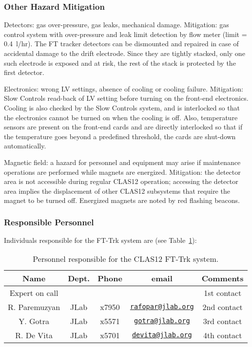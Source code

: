 \subsubsection{Other Hazard Mitigation}

Detectors: gas over-pressure, gas leaks, mechanical damage. Mitigation: gas control system with 
over-pressure and leak limit detection by flow meter (limit = 0.4~l/hr). The FT tracker detectors 
can be dismounted and repaired in case of accidental damage to the drift electrode. Since they are 
tightly stacked, only one such electrode is exposed and at risk, the rest of the stack is protected 
by the first detector.

Electronics: wrong LV settings, absence of cooling or cooling failure. Mitigation: Slow Controls 
read-back of LV setting before turning on the front-end electronics. Cooling is also checked by 
the Slow Controls system, and is interlocked so that the electronics cannot be turned on when the 
cooling is off. Also, temperature sensors are present on the front-end cards and are directly 
interlocked so that if the temperature goes beyond a predefined threshold, the cards are shut-down 
automatically.

Magnetic field: a hazard for personnel and equipment may arise if maintenance operations are 
performed while magnets are energized. Mitigation: the detector area is not accessible during 
regular CLAS12 operation; accessing the detector area implies the displacement of other CLAS12 
subsystems that require the magnet to be turned off. Energized magnets are noted by red flashing 
beacons.

\subsubsection{Responsible Personnel}

Individuals responsible for the FT-Trk system are (see Table~\ref{tb:ft-trk}):

\begin{table}[!htb]
\centering
\begin{tabular}{|c|c|c|c|c|} \hline
Name          & Dept. & Phone & email & Comments \\ \hline
Expert on call&       &       &       & 1st contact \\ \hline
R. Paremuzyan & JLab  &x7950&\href{mailto:rafopar@jlab.org}{\nolinkurl{rafopar@jlab.org}}&2nd contact \\ \hline
Y. Gotra      & JLab  &x5571&\href{mailto:gotra@jlab.org}{\nolinkurl{gotra@jlab.org}}&3rd contact \\ \hline
R. De Vita    & JLab  &x5701&\href{mailto:devita@jlab.org}{\nolinkurl{devita@jlab.org}}&4th contact \\ \hline
\end{tabular}
\caption{Personnel responsible for the CLAS12 FT-Trk system.} 
\label{tb:ft-trk}
\end{table}
